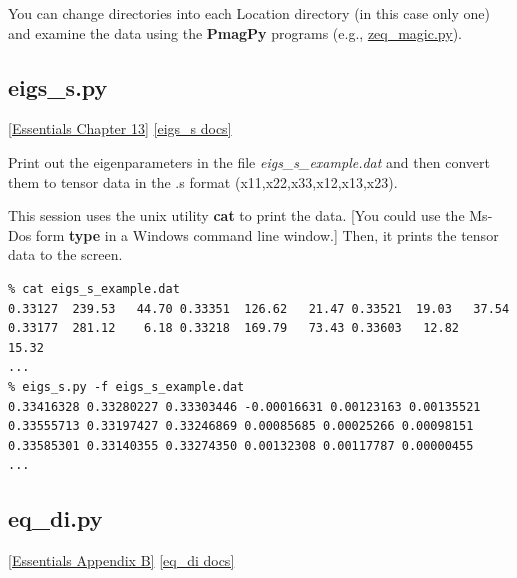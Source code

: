 \documentclass[11pt]{book}
\begin{document}
{{{You can change directories into each Location directory (in this case only one) and examine the data using the {\bf PmagPy} programs (e.g., \href{#zeq_magic.py}{zeq\_magic.py}).   


\subsection{eigs\_s.py}
\href{http://magician.ucsd.edu/Essentials_2/WebBook2ch13.html#ch13}{ [Essentials Chapter 13]}
\href{http://earthref.org/PmagPy/pmagpydocs/eigs_s-module.html}{[eigs\_s docs]}

Print out the eigenparameters  in the file {\it eigs\_s\_example.dat} and then
convert them to tensor data in the .s format (x11,x22,x33,x12,x13,x23).   

This session uses the unix utility {\bf cat} to print the data.  [You could use the Ms-Dos 
form {\bf type} in a Windows command line window.]    Then, it prints the tensor data to the screen.  

\begin{verbatim}
% cat eigs_s_example.dat 
0.33127  239.53   44.70 0.33351  126.62   21.47 0.33521  19.03   37.54
0.33177  281.12    6.18 0.33218  169.79   73.43 0.33603   12.82   15.32
...
% eigs_s.py -f eigs_s_example.dat
0.33416328 0.33280227 0.33303446 -0.00016631 0.00123163 0.00135521 
0.33555713 0.33197427 0.33246869 0.00085685 0.00025266 0.00098151 
0.33585301 0.33140355 0.33274350 0.00132308 0.00117787 0.00000455 
...
\end{verbatim}





%
\subsection{eq\_di.py}
\href{http://magician.ucsd.edu/Essentials_2/WebBook2.html#equal_area}{[Essentials Appendix B]}
\href{http://earthref.org/PmagPy/pmagpydocs/eq_di-module.html}{[eq\_di docs]}

}}}
\end{document}

